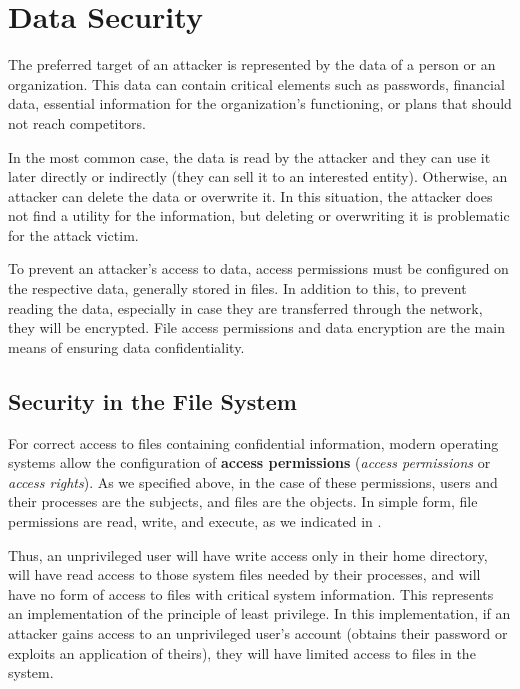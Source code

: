 \section{Data Security}
\label{sec:sec:data}

The preferred target of an attacker is represented by the data of a person or an organization.
This data can contain critical elements such as passwords, financial data, essential information for the organization's functioning, or plans that should not reach competitors.

In the most common case, the data is read by the attacker and they can use it later directly or indirectly (they can sell it to an interested entity).
Otherwise, an attacker can delete the data or overwrite it.
In this situation, the attacker does not find a utility for the information, but deleting or overwriting it is problematic for the attack victim.

To prevent an attacker's access to data, access permissions must be configured on the respective data, generally stored in files.
In addition to this, to prevent reading the data, especially in case they are transferred through the network, they will be encrypted.
File access permissions and data encryption are the main means of ensuring data confidentiality.

\subsection{Security in the File System}
\label{sec:sec:data:fs}

For correct access to files containing confidential information, modern operating systems allow the configuration of \textbf{access permissions} (\textit{access permissions} or \textit{access rights}).
As we specified above, in the case of these permissions, users and their processes are the subjects, and files are the objects.
In simple form, file permissions are read, write, and execute, as we indicated in .

Thus, an unprivileged user will have write access only in their home directory, will have read access to those system files needed by their processes, and will have no form of access to files with critical system information.
This represents an implementation of the principle of least privilege.
In this implementation, if an attacker gains access to an unprivileged user's account (obtains their password or exploits an application of theirs), they will have limited access to files in the system.

